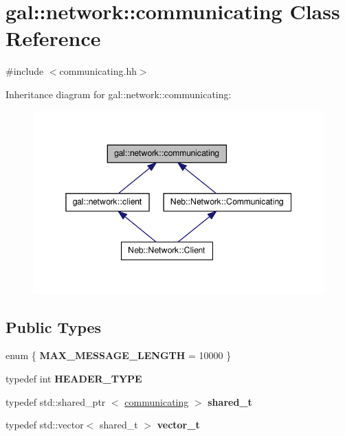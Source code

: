 \hypertarget{classgal_1_1network_1_1communicating}{\section{gal\-:\-:network\-:\-:communicating \-Class \-Reference}
\label{classgal_1_1network_1_1communicating}
}


{\ttfamily \#include $<$communicating.\-hh$>$}



\-Inheritance diagram for gal\-:\-:network\-:\-:communicating\-:\nopagebreak
\begin{figure}[H]
\begin{center}
\leavevmode
\includegraphics[width=348pt]{classgal_1_1network_1_1communicating__inherit__graph}
\end{center}
\end{figure}
\subsection*{\-Public \-Types}
\begin{DoxyCompactItemize}
\item 
enum \{ {\bfseries \-M\-A\-X\-\_\-\-M\-E\-S\-S\-A\-G\-E\-\_\-\-L\-E\-N\-G\-T\-H} =  10000
 \}
\item 
\hypertarget{classgal_1_1network_1_1communicating_aef6c11aca9b227ec65e289b5f194cd83}{typedef int {\bfseries \-H\-E\-A\-D\-E\-R\-\_\-\-T\-Y\-P\-E}}\label{classgal_1_1network_1_1communicating_aef6c11aca9b227ec65e289b5f194cd83}

\item 
\hypertarget{classgal_1_1network_1_1communicating_a20c6f2dc53a296b6b34a82d5dc8f894a}{typedef std\-::shared\-\_\-ptr\*
$<$ \hyperlink{classgal_1_1network_1_1communicating}{communicating} $>$ {\bfseries shared\-\_\-t}}\label{classgal_1_1network_1_1communicating_a20c6f2dc53a296b6b34a82d5dc8f894a}

\item 
\hypertarget{classgal_1_1network_1_1communicating_acde720b70acbd7aecc86d2ebd4d91113}{typedef std\-::vector$<$ shared\-\_\-t $>$ {\bfseries vector\-\_\-t}}\label{classgal_1_1network_1_1communicating_acde720b70acbd7aecc86d2ebd4d91113}

\end{DoxyCompactItemize}
